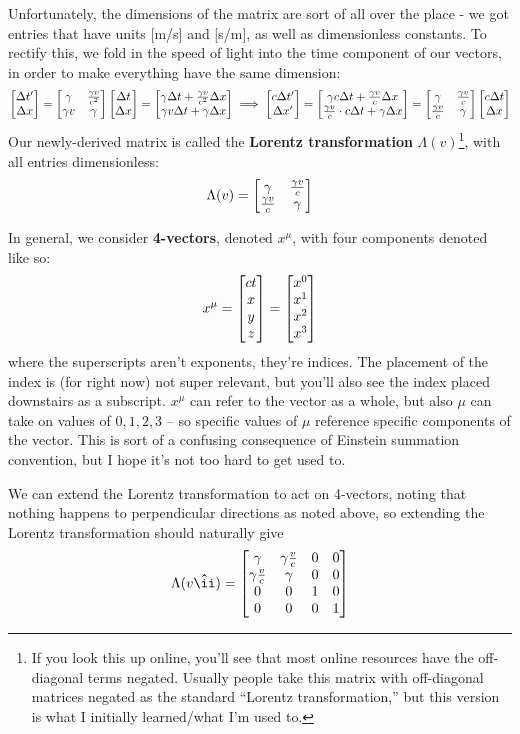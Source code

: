 \documentclass[12pt]{scrartcl}
\begin{document}
Unfortunately, the dimensions of the matrix are sort of all over the place - we got entries that have units [m/s] and [s/m], as well as dimensionless constants. To rectify this, we fold in the speed of light into the time component of our vectors, in order to make everything have the same dimension:
\[
	\begin{bmatrix}\Delta t' \\ \Delta x\end{bmatrix}
	= \begin{bmatrix}\gamma & \frac{\gamma v}{c^2} \\ \gamma v & \gamma\end{bmatrix} \begin{bmatrix}\Delta t \\ \Delta x\end{bmatrix}
	= \begin{bmatrix}\gamma \Delta t + \frac{\gamma v}{c^2}\Delta x
		\\ \gamma v \Delta t + \gamma \Delta x\end{bmatrix}
	\implies
	\begin{bmatrix}c\Delta t' \\ \Delta x'\end{bmatrix}
	= \begin{bmatrix}\gamma c \Delta t + \frac{\gamma v}{c}\Delta x
		\\ \frac{\gamma v}{c} \cdot c \Delta t + \gamma \Delta x \end{bmatrix}
	= \begin{bmatrix}
		\gamma & \frac{\gamma v}{c} \\ \frac{\gamma v}{c} & \gamma
	\end{bmatrix}\begin{bmatrix}
		c\Delta t \\ \Delta x
	\end{bmatrix}
\]
Our newly-derived matrix is called the \textbf{Lorentz transformation} $\Lambda (v)$\footnote{If you look this up online, you'll see that most online resources have the off-diagonal terms negated. Usually people take this matrix with off-diagonal matrices negated as the standard ``Lorentz transformation,'' but this version is what I initially learned/what I'm used to. }, with all entries dimensionless:
\[
	\Lambda (v) = \begin{bmatrix}
		\gamma & \frac{\gamma v}{c} \\ \frac{\gamma v}{c} & \gamma
	\end{bmatrix}
\]

In general, we consider \textbf{4-vectors}, denoted $x^\mu$, with four components denoted like so:
\[
	x^\mu = \begin{bmatrix}ct \\ x \\ y \\ z\end{bmatrix} = \begin{bmatrix}x^0 \\ x^1 \\ x^2 \\ x^3\end{bmatrix}
\]
where the superscripts aren't exponents, they're indices. The placement of the index is (for right now) not super relevant, but you'll also see the index placed downstairs as a subscript. $x^\mu$ can refer to the vector as a whole, but also $\mu$ can take on values of $0, 1, 2, 3$ -- so specific values of $\mu$ reference specific components of the vector. This is sort of a confusing consequence of Einstein summation convention, but I hope it's not too hard to get used to.

We can extend the Lorentz transformation to act on 4-vectors, noting that nothing happens to perpendicular directions as noted above, so extending the Lorentz transformation should naturally give
\[
	\Lambda(v \ihatt) =
	\bmat{
		\gamma             & \gamma \frac{v}{c} & 0 & 0 \\
		\gamma \frac{v}{c} & \gamma             & 0 & 0 \\
		0                  & 0                  & 1 & 0 \\
		0                  & 0                  & 0 & 1
	}
\]
\end{document}
